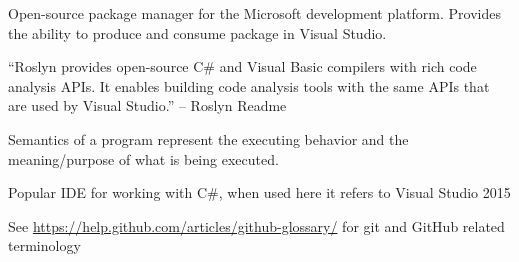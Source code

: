 \documentclass[draftclsnofoot,onecolumn]{IEEEtran}
\begin{document}
\begin{description}
\item[NuGet Package:] Open-source package manager for the Microsoft 
development platform. Provides the ability to produce and consume package in 
Visual Studio.

\item[Roslyn:] “Roslyn provides open-source C\# and Visual Basic compilers 
with rich code analysis APIs. It enables building code analysis tools with 
the same APIs that are used by Visual Studio.” – Roslyn Readme 

\item[Semantics:] Semantics of a program represent the executing behavior 
and the meaning/purpose of what is being executed. 

\item[VS:] Popular IDE for working with C\#, when used here it refers to 
Visual Studio 2015

\end{description}

See \url{https://help.github.com/articles/github-glossary/} for git and 
GitHub related terminology
\end{document}

